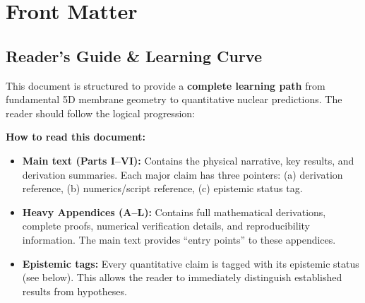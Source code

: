 \documentclass[11pt,a4paper]{article}
\begin{document}
\section*{Front Matter}

\subsection*{Reader's Guide \& Learning Curve}

This document is structured to provide a \textbf{complete learning path} from fundamental 5D membrane geometry to quantitative nuclear predictions. The reader should follow the logical progression:

\begin{center}
\end{center}

\textbf{How to read this document:}
\begin{itemize}
    \item \textbf{Main text (Parts I--VI):} Contains the physical narrative, key results, and derivation summaries. Each major claim has three pointers: (a) derivation reference, (b) numerics/script reference, (c) epistemic status tag.

    \item \textbf{Heavy Appendices (A--L):} Contains full mathematical derivations, complete proofs, numerical verification details, and reproducibility information. The main text provides ``entry points'' to these appendices.

    \item \textbf{Epistemic tags:} Every quantitative claim is tagged with its epistemic status (see below). This allows the reader to immediately distinguish established results from hypotheses.
\end{itemize}
\end{document}
